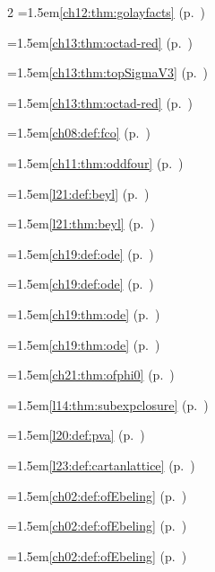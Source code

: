 \begin{multicols}{2}
\hangindent=1.5em\quad \ref{ch12:thm:golayfacts} (p.~\pageref{ch12:thm:golayfacts})\par
\hangindent=1.5em\quad \ref{ch13:thm:octad-red} (p.~\pageref{ch13:thm:octad-red})\par
\hangindent=1.5em\quad \ref{ch13:thm:topSigmaV3} (p.~\pageref{ch13:thm:topSigmaV3})\par
\hangindent=1.5em\quad \ref{ch13:thm:octad-red} (p.~\pageref{ch13:thm:octad-red})\par
\hangindent=1.5em\quad \ref{ch08:def:fco} (p.~\pageref{ch08:def:fco})\par
\hangindent=1.5em\quad \ref{ch11:thm:oddfour} (p.~\pageref{ch11:thm:oddfour})\par
\hangindent=1.5em\quad \ref{l21:def:beyl} (p.~\pageref{l21:def:beyl})\par
\hangindent=1.5em\quad \ref{l21:thm:beyl} (p.~\pageref{l21:thm:beyl})\par
\hangindent=1.5em\quad \ref{ch19:def:ode} (p.~\pageref{ch19:def:ode})\par
\hangindent=1.5em\quad \ref{ch19:def:ode} (p.~\pageref{ch19:def:ode})\par
\hangindent=1.5em\quad \ref{ch19:thm:ode} (p.~\pageref{ch19:thm:ode})\par
\hangindent=1.5em\quad \ref{ch19:thm:ode} (p.~\pageref{ch19:thm:ode})\par
\hangindent=1.5em\quad \ref{ch21:thm:ofphi0} (p.~\pageref{ch21:thm:ofphi0})\par
\hangindent=1.5em\quad \ref{l14:thm:subexpclosure} (p.~\pageref{l14:thm:subexpclosure})\par
\hangindent=1.5em\quad \ref{l20:def:pva} (p.~\pageref{l20:def:pva})\par
\hangindent=1.5em\quad \ref{l23:def:cartanlattice} (p.~\pageref{l23:def:cartanlattice})\par
\hangindent=1.5em\quad \ref{ch02:def:ofEbeling} (p.~\pageref{ch02:def:ofEbeling})\par
\hangindent=1.5em\quad \ref{ch02:def:ofEbeling} (p.~\pageref{ch02:def:ofEbeling})\par
\hangindent=1.5em\quad \ref{ch02:def:ofEbeling} (p.~\pageref{ch02:def:ofEbeling})\par

\end{multicols}
